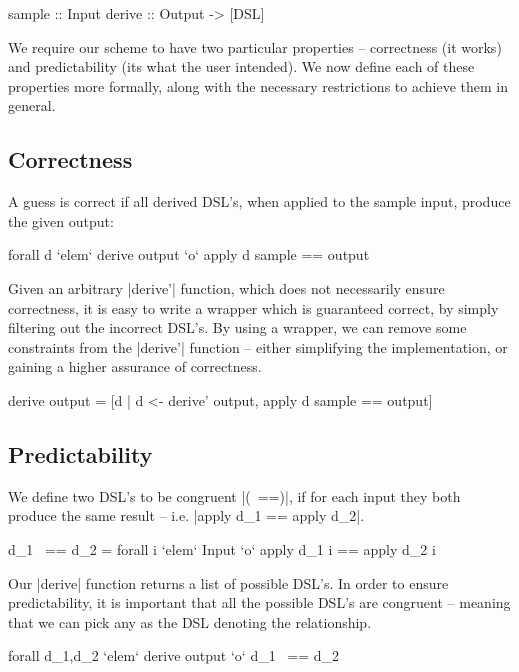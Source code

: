 \documentclass[preprint]{sigplanconf}
\begin{document}
\begin{code}
sample :: Input
derive :: Output -> [DSL]
\end{code}

We require our scheme to have two particular properties -- correctness (it works) and predictability (its what the user intended). We now define each of these properties more formally, along with the necessary restrictions to achieve them in general.

\subsection{Correctness}
\label{sec:correctness}

A guess is correct if all derived DSL's, when applied to the sample input, produce the given output:

\ignore\begin{code}
forall d `elem` derive output `o` apply d sample == output
\end{code}

Given an arbitrary |derive'| function, which does not necessarily ensure correctness, it is easy to write a wrapper which is guaranteed correct, by simply filtering out the incorrect DSL's. By using a wrapper, we can remove some constraints from the |derive'| function -- either simplifying the implementation, or gaining a higher assurance of correctness.

\begin{code}
derive output = [d | d <- derive' output, apply d sample == output]
\end{code}

\subsection{Predictability}

We define two DSL's to be congruent |(~==)|, if for each input they both produce the same result -- i.e. |apply d_1 == apply d_2|.

\ignore\begin{code}
d_1 ~== d_2 = forall i `elem` Input `o` apply d_1 i == apply d_2 i
\end{code}

Our |derive| function returns a list of possible DSL's. In order to ensure predictability, it is important that all the possible DSL's are congruent -- meaning that we can pick any as the DSL denoting the relationship.

\ignore\begin{code}
forall d_1,d_2 `elem` derive output `o` d_1 ~== d_2
\end{code}
\end{document}
